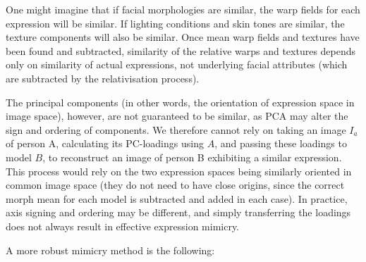 \documentclass[runningheads]{llncs}
\begin{document}
 One might imagine that if facial morphologies are similar, the warp fields for each expression will be similar. If lighting conditions and skin tones are similar, the texture components will also be similar. Once mean warp fields and textures have been found and subtracted, similarity of the relative warps and textures depends only on similarity of actual expressions, not underlying facial attributes (which are subtracted by the relativisation process).
 
The principal components (in other words, the orientation of expression space in image space), however, are not guaranteed to be similar, as PCA may alter the sign and ordering of components\cite{jolliffe2002principal}. We therefore cannot rely on taking an image $I_a$ of person A, calculating its PC-loadings using $A$, and passing these loadings to model $B$, to reconstruct an image of person B exhibiting a similar expression. This process would rely on the two expression spaces being similarly oriented in common image space (they do not need to have close origins, since the correct morph mean for each model is subtracted and added in each case). In practice, axis signing and ordering may be different, and simply transferring the loadings does not always result in effective expression mimicry.

A more robust mimicry method is the following:
\end{document}
